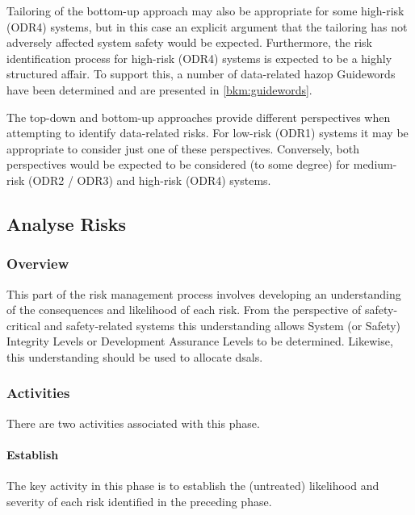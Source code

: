 Tailoring of the bottom-up approach may also be appropriate for some high-risk (ODR4) systems, but in this case an explicit argument that the tailoring has not adversely affected system safety would be expected. Furthermore, the risk identification process for high-risk (ODR4) systems is expected to be a highly structured affair. To support this, a number of data-related \gls{hazop} Guidewords have been determined
and are presented in \autoref{bkm:guidewords}.

The top-down and bottom-up approaches provide different perspectives when attempting to identify data-related risks. For low-risk (ODR1) systems it may be appropriate to consider just one of these perspectives. Conversely, both perspectives would be expected to be considered (to some degree) for medium-risk (ODR2 / ODR3) and high-risk (ODR4) systems.
%
\subsection{Analyse Risks}
\subsubsection{Overview}
This part of the risk management process involves developing an understanding of the consequences and likelihood of each risk. From the perspective of safety-critical and safety-related systems this understanding allows System (or Safety) Integrity Levels or Development Assurance Levels to be determined. Likewise, this understanding should be used to allocate
\glspl{dsal}.
%
%
\subsubsection{Activities}
There are two activities associated with this phase.
%
\paragraph{Establish }
\label{bkm:DSAL-table-section}
The key activity in this phase is to establish the (untreated) likelihood and severity of each risk identified in the preceding phase.

